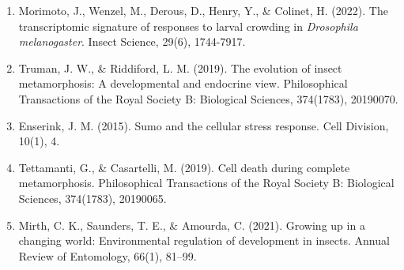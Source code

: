 \documentclass[lineno]{wiley-article}
\begin{document}
\begin{enumerate}
\item Morimoto, J., Wenzel, M., Derous, D., Henry, Y., \& Colinet, H. (2022). The transcriptomic signature of responses to larval crowding in \textit{Drosophila melanogaster}. Insect Science, 29(6), 1744-7917.

\item Truman, J. W., \& Riddiford, L. M. (2019). The evolution of insect metamorphosis: A developmental and endocrine view. Philosophical Transactions of the Royal Society B: Biological Sciences, 374(1783), 20190070.

\item Enserink, J. M. (2015). Sumo and the cellular stress response. Cell Division, 10(1), 4.

\item Tettamanti, G., \& Casartelli, M. (2019). Cell death during complete metamorphosis. Philosophical Transactions of the Royal Society B: Biological Sciences, 374(1783), 20190065.

\item Mirth, C. K., Saunders, T. E., \& Amourda, C. (2021). Growing up in a changing world: Environmental regulation of development in insects. Annual Review of Entomology, 66(1), 81–99.


\end{enumerate}





\end{document}
